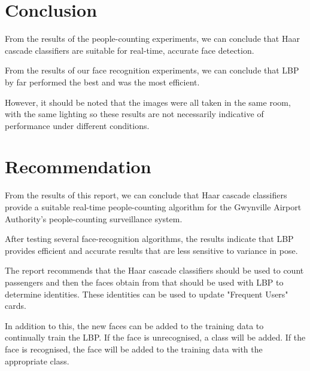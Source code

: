 \documentclass{article}
\begin{document}
\section{Conclusion}
From the results of the people-counting experiments, we can conclude that Haar cascade classifiers are suitable for real-time, accurate face detection.

From the results of our face recognition experiments, we can conclude that LBP by far performed the best and was the most efficient.

However, it should be noted that the images were all taken in the same room, with the same lighting so these results are not necessarily indicative of performance under different conditions.

\section{Recommendation}
From the results of this report, we can conclude that Haar cascade classifiers provide a suitable real-time people-counting algorithm for the Gwynville Airport Authority's  people-counting surveillance system.

After testing several face-recognition algorithms, the results indicate that LBP provides efficient and accurate results that are less sensitive to variance in pose.

The report recommends that the Haar cascade classifiers should be used to count passengers and then the faces obtain from that should be used with LBP to determine identities. These identities can be used to update "Frequent Users" cards.

In addition to this, the new faces can be added to the training data to continually train the LBP. If the face is unrecognised, a class will be added. If the face is recognised, the face will be added to the training data with the appropriate class.



\end{document}
